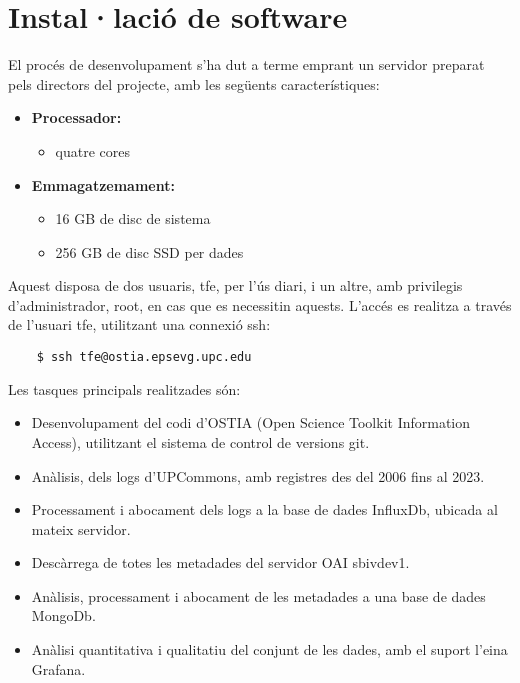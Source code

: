 \chapter{Instal·lació de software}\label{ch:software-installation}

El procés de desenvolupament s’ha dut a terme emprant un servidor preparat pels directors del projecte, amb les següents característiques:

\begin{itemize}
    \item \textbf{Processador:}
    \begin{itemize}
        \item quatre cores
    \end{itemize}
    \item \textbf{Emmagatzemament:}
    \begin{itemize}
        \item 16 GB de disc de sistema
        \item 256 GB de disc SSD per dades
    \end{itemize}
\end{itemize}

\noindent
Aquest disposa de dos usuaris, tfe, per l’ús diari, i un altre, amb privilegis d’administrador, root, en cas que es necessitin aquests.
L’accés es realitza a través de l’usuari tfe, utilitzant una connexió ssh:

\begin{verbatim}
    $ ssh tfe@ostia.epsevg.upc.edu
\end{verbatim}

\noindent
Les tasques principals realitzades són:

\begin{itemize}
    \item Desenvolupament del codi d’OSTIA (Open Science Toolkit Information Access), utilitzant el sistema de control de versions git.
    \item Anàlisis, dels logs d’UPCommons, amb registres des del 2006 fins al 2023.
    \item Processament i abocament dels logs a la base de dades InfluxDb, ubicada al mateix servidor.
    \item Descàrrega de totes les metadades del servidor OAI sbivdev1.
    \item Anàlisis, processament i abocament de les metadades a una base de dades MongoDb.
    \item Anàlisi quantitativa i qualitatiu del conjunt de les dades, amb el suport l’eina Grafana.
\end{itemize}

